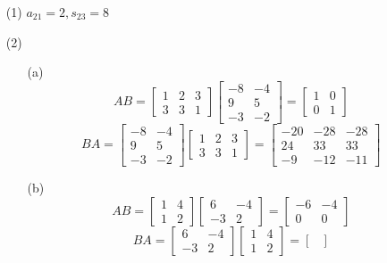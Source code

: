 \begin{itemize}
\item[(1)]
$a_{21} = 2, s_{23} = 8$
\item[(2)]
\begin{itemize}
\item[(a)]
$$AB = \begin{bmatrix}
1 & 2 & 3 \\
3 & 3 & 1
\end{bmatrix}\begin{bmatrix}
-8 & -4 \\
9 & 5 \\
-3 & -2
\end{bmatrix} = \begin{bmatrix}
1 & 0 \\
0 & 1
\end{bmatrix}$$
$$BA = \begin{bmatrix}
-8 & -4 \\
9 & 5 \\
-3 & -2
\end{bmatrix}\begin{bmatrix}
1 & 2 & 3 \\
3 & 3 & 1
\end{bmatrix} = \begin{bmatrix}
-20 & -28 & - 28 \\
24 & 33 & 33 \\
-9 & -12 & -11
\end{bmatrix}$$
\item[(b)]
$$AB = \begin{bmatrix}
1 & 4 \\
1 & 2
\end{bmatrix}\begin{bmatrix}
6 & -4 \\
-3 & 2
\end{bmatrix} = \begin{bmatrix}
-6 & -4 \\
0 & 0
\end{bmatrix}$$
$$BA = \begin{bmatrix}
6 & -4 \\
-3 & 2
\end{bmatrix}\begin{bmatrix}
1 & 4 \\
1 & 2
\end{bmatrix} = \begin{bmatrix}

\end{bmatrix}$$
\end{itemize}
\end{itemize}
